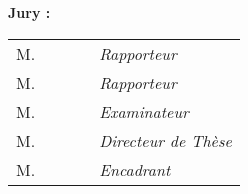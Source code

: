 {\begin{titlepage}
\begin{center}
 		\end{center}
 		\noindent \large \textbf{Jury :}
 		\begin{center}
 			\begin{tabular}{llccl}
 				M.		& \revOneName 	& \revOneTitle	&	\revOneAff	& \textit{Rapporteur}\\
 				M.		& \revTwoName	& \revTwoTitle	&	\revTwoAff	& \textit{Rapporteur}\\	
 				M.		& \examOneName	& \examOneTitle	&	\examOneAff	& \textit{Examinateur}\\
 				M.		& \dirName 		& \dirTitle		&	\dirAff		& \textit{Directeur de Th\`ese}\\
 				M. 	& \supName 		& \supTitle		&	\supAff		& \textit{Encadrant}\\
 			\end{tabular}
 		\end{center}
 		\restoregeometry
 	\end{titlepage}
 }
 
 
